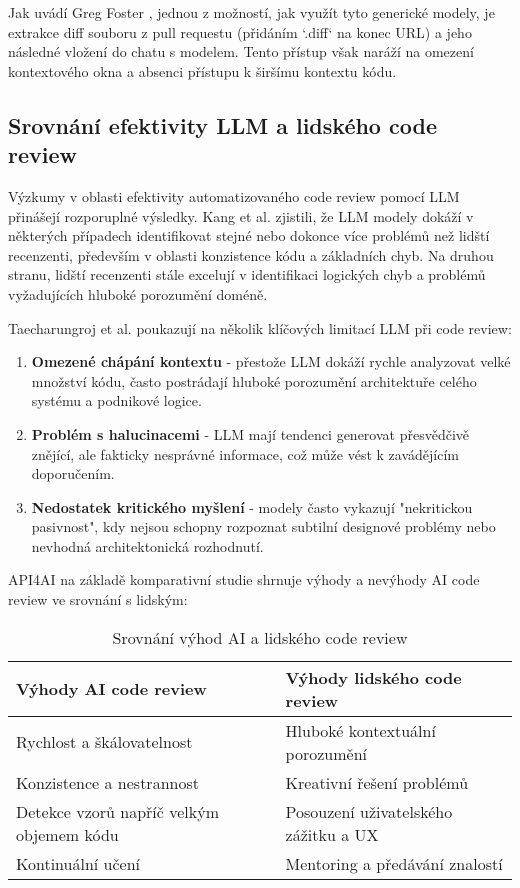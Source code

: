 \documentclass[12pt, a4paper]{article}
\begin{document}
Jak uvádí Greg Foster \cite{graphite2023}, jednou z možností, jak využít tyto generické modely, je extrakce diff souboru z pull requestu (přidáním `.diff` na konec URL) a jeho následné vložení do chatu s modelem. Tento přístup však naráží na omezení kontextového okna a absenci přístupu k širšímu kontextu kódu.

\subsection{Srovnání efektivity LLM a lidského code review}

Výzkumy v oblasti efektivity automatizovaného code review pomocí LLM přinášejí rozporuplné výsledky. Kang et al. \cite{kang2023} zjistili, že LLM modely dokáží v některých případech identifikovat stejné nebo dokonce více problémů než lidští recenzenti, především v oblasti konzistence kódu a základních chyb. Na druhou stranu, lidští recenzenti stále excelují v identifikaci logických chyb a problémů vyžadujících hluboké porozumění doméně.

Taecharungroj et al. \cite{taecharungroj2023} poukazují na několik klíčových limitací LLM při code review:

\begin{enumerate}
    \item \textbf{Omezené chápání kontextu} - přestože LLM dokáží rychle analyzovat velké množství kódu, často postrádají hluboké porozumění architektuře celého systému a podnikové logice.
    \item \textbf{Problém s halucinacemi} - LLM mají tendenci generovat přesvědčivě znějící, ale fakticky nesprávné informace, což může vést k zavádějícím doporučením.
    \item \textbf{Nedostatek kritického myšlení} - modely často vykazují "nekritickou pasivnost", kdy nejsou schopny rozpoznat subtilní designové problémy nebo nevhodná architektonická rozhodnutí.
\end{enumerate}

API4AI \cite{api4ai2023} na základě komparativní studie shrnuje výhody a nevýhody AI code review ve srovnání s lidským:

\begin{table}[H]
\centering
\begin{tabular}{|p{}|p{}|}
\hline
\textbf{Výhody AI code review} & \textbf{Výhody lidského code review} \\
\hline
Rychlost a škálovatelnost & Hluboké kontextuální porozumění \\
Konzistence a nestrannost & Kreativní řešení problémů \\
Detekce vzorů napříč velkým objemem kódu & Posouzení uživatelského zážitku a UX \\
Kontinuální učení & Mentoring a předávání znalostí \\
\hline
\end{tabular}
\caption{Srovnání výhod AI a lidského code review \cite{api4ai2023}}
\end{table}
\end{document}
